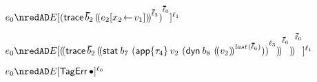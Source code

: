 {\begin{lamportproof*}
    \begin{pfproof}
        \begin{pfproof}
          \qedstep
            \begin{pfproof}
              \(\sexpr_0 \nredAD
                \ctx\ctxbars{\obars{\eprehist{\sblist_2}{\obbars{\esubst{\sexpr_2}{\svar_2}{\svalue_1}}{\sownerlist_3}}}{\sownerlist_0}}{\sowner_1}
              \)
            \end{pfproof}
        \end{pfproof}
        \begin{pfproof}
          \qedstep
            \begin{pfproof}
              \(\sexpr_0 \nredAD
                \ctx\ctxbars{\obbars{\eprehist{\sblist_2}{\obbars{\estab{\sbnd_7}{\obars{\eapp{{\stype_4}}{\svalue_2}{(\edynb{\sbnd_8}{\obbars{\svalue_2}{\flast{\sownerlist_6}}})}}{\sowner_3}}}{\sownerlist_6}}}{\sownerlist_0}}{\sowner_1}
              \)
            \end{pfproof}
        \end{pfproof}
        \begin{pfproof}
          \qedstep
            \begin{pfproof}
              $\sexpr_0 \nredAD \ctx\ctxbars{\tagerrorD}{\sowner_0}$
            \end{pfproof}
        \end{pfproof}
    \end{pfproof}


\end{lamportproof*}}

